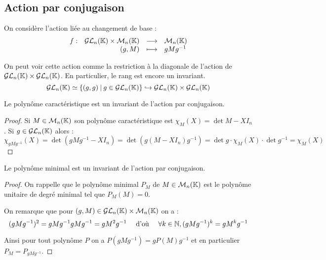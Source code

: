 \subsection{Action par conjugaison}
\vspace{0.5em}

On considère l'action liée au changement de base :
\begin{displaymath} \begin{array}{rrcl}
   f:&   \mathcal{GL}_n(\mathbb{K})\times \mathcal{M}_n(\mathbb{K})&\longrightarrow&\mathcal{M}_n(\mathbb{K}) \\
      &     (g,M)&\longmapsto&gMg^{-1} \\
       \end{array}\end{displaymath}

On peut voir cette action comme la restriction à la diagonale de l'action de
$\mathcal{GL}_n(\mathbb{K})\times\mathcal{GL}_n(\mathbb{K})$. En particulier, le rang est encore un invariant.
\begin{displaymath} \mathcal{GL}_n(\mathbb{K}) \simeq \{(g,g) \: | \: g \in \mathcal{GL}_n(\mathbb{K})\}
\hookrightarrow\mathcal{GL}_n(\mathbb{K})\times\mathcal{GL}_n(\mathbb{K})\end{displaymath}

\begin{lemm}
 
Le polynôme caractéristique est un invariant de l'action par conjugaison.
\end{lemm}
\begin{proof} Si $M \in \mathcal{M}_n(\mathbb{K})$ son polynôme caractéristique est $\chi_M(X) =
\det M-XI_n$. Si $g\in\mathcal{GL}_n(\mathbb{K})$ alors :
\begin{displaymath}\chi_{gMg^{-1}}(X) = \det (gMg^{-1} - XI_n) = \det
\left(g\left(M-XI_n\right)g^{-1}\right) = \det g \cdotp \chi_M(X) \cdotp \det
g^{-1} = \chi_M(X)\end{displaymath}
\end{proof}

\begin{lemm}
 
Le polynôme minimal est un invariant de l'action par conjugaison.
\end{lemm}

\begin{proof}
On rappelle que le  polynôme minimal $P_M$ de $M\in \mathcal{M}_n(\mathbb{K})$ est le polynôme
unitaire de degré minimal tel que $P_M(M)=0$.

On remarque que pour $(g,M) \in \mathcal{GL}_n(\mathbb{K}) \times \mathcal{M}_n(\mathbb{K})$ on a :
\begin{displaymath}(gMg^{-1})^2 = gMg^{-1}gMg^{-1} = gM^2g^{-1} \quad \text{
d'où }\quad \forall
k \in \mathbb{N}, (gMg^{-1})^k = gM^kg^{-1} \end{displaymath}

Ainsi pour tout polynôme $P$ on a $P(gMg^{-1}) = gP(M)g^{-1}$ et en particulier
$P_M = P_{gMg^{-1}}$.
\end{proof}


